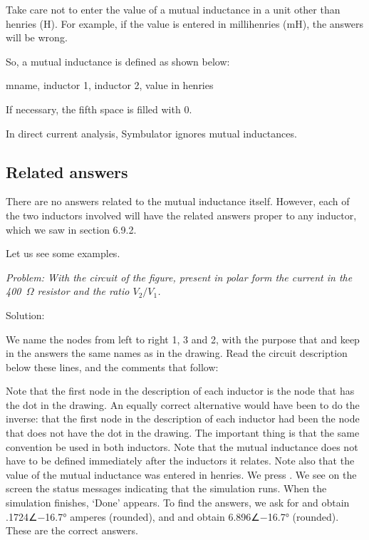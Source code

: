 Take care not to enter the value of a mutual inductance in a unit
other than henries (H). For example, if the value is entered in
millihenries (mH), the answers will be wrong.

So, a mutual inductance is defined as shown below:

\begin{entry}
mname, inductor 1, inductor 2, value in henries
\end{entry}

If necessary, the fifth space is filled with 0.

In direct current analysis, Symbulator ignores mutual inductances.

\subsection{Related answers}

There are no answers related to the mutual inductance itself.
However, each of the two inductors involved will have the related
answers proper to any inductor, which we saw in section 6.9.2.

Let us see some examples.


\emph{Problem: With the circuit of the figure, present in polar form
the current in the 400~$\Omega$ resistor and the ratio $V_2/V_1$.}

Solution:

We name the nodes from left to right 1, 3 and 2, with the purpose
that  and  keep in the answers the same names as
in the drawing. Read the circuit description below these lines, and
the comments that follow:


Note that the first node in the description of each inductor is the
node that has the dot in the drawing. An equally correct alternative
would have been to do the inverse: that the first node in the
description of each inductor had been the node that does not have
the dot in the drawing. The important thing is that the same
convention be used in both inductors. Note that the mutual
inductance does not have to be defined immediately after the
inductors it relates. Note also that the value of the mutual
inductance was entered in henries. We press . We see on
the screen the status messages indicating that the simulation runs.
When the simulation finishes, `Done' appears. To find the answers,
we ask for  and obtain .1724∠$-$16.7° amperes
(rounded), and  and obtain 6.896∠$-$16.7°
(rounded). These are the correct answers.

